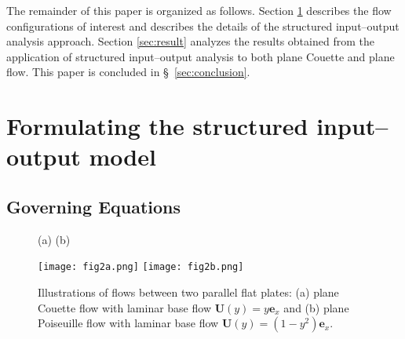 The remainder of this paper is organized as follows. Section \ref{sec:structured_IO} describes the flow configurations of interest and describes the details of the structured input--output analysis approach. Section \ref{sec:result} analyzes the results obtained from the application of structured input--output analysis to both plane Couette and plane  flow.  This paper is concluded in \S\ \ref{sec:conclusion}. 






\section{Formulating the structured input--output model }
\label{sec:structured_IO}

\subsection{Governing Equations}

\begin{figure}

	(a) \hspace{0.49\textwidth} (b)
	
\centering
\texttt{[image: fig2a.png]}
\texttt{[image: fig2b.png]}
    \caption{ Illustrations of flows between two parallel flat plates: (a) plane Couette flow with laminar base flow $\boldsymbol{U}(y)=y\boldsymbol{e}_x$ and (b) plane Poiseuille flow with laminar base flow $\boldsymbol{U}(y)=(1-y^2)\boldsymbol{e}_x$. }
    \label{fig:flow_config_cou_poi}
\end{figure}


